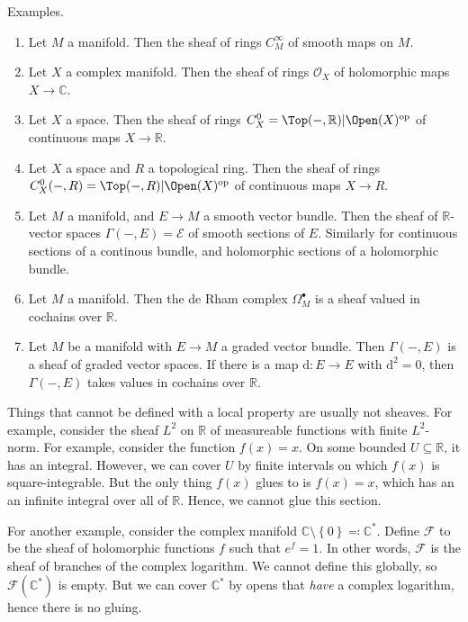 Examples.
\begin{enumerate}
	\item Let $M$ a manifold. Then the sheaf of rings $C^\infty_{M}$ of smooth maps on $M$.
	\item Let $X$ a complex manifold. Then the sheaf of rings $\mathcal{O}_{X} $ of holomorphic maps $X\to \mathbb{C} $.
	\item Let $X$ a space. Then the sheaf of rings $C^0_X=\Top (-,\mathbb{R} )|\Open(X)^{\mathrm{op}} $ of continuous maps $X\to \mathbb{R} $.
	\item Let $X$ a space and $R$ a topological ring. Then the sheaf of rings $C^0_X(-,R)=\Top (-,R)|\Open(X) ^{\mathrm{op}} $ of continuous maps $X\to R$.
	\item Let $M$ a manifold, and $E\to M$ a smooth vector bundle. Then the sheaf of $\mathbb{R} $-vector spaces $\Gamma (-,E)=\mathcal{E} $ of smooth sections of $E$. Similarly for continuous sections of a continous bundle, and holomorphic sections of a holomorphic bundle.
	\item Let $M$ a manifold. Then the de Rham complex $\Omega ^{\bullet} _M$ is a sheaf valued in cochains over $\mathbb{R} $.
	\item Let $M$ be a manifold with $E\to M$ a graded vector bundle. Then $\Gamma (-,E)$ is a sheaf of graded vector spaces. If there is a map $\mathrm{d}: E \to E$ with $\mathrm{d} ^2=0$, then $\Gamma (-,E)$ takes values in cochains over $\mathbb{R} $.
\end{enumerate}

Things that cannot be defined with a local property are usually not sheaves. For example, consider the sheaf $L^2$ on $\mathbb{R} $ of measureable functions with finite $L^2$-norm. For example, consider the function $f(x) = x$. On some bounded $U\subseteq \mathbb{R} $, it has an integral. However, we can cover $U$ by finite intervals on which $f(x)$ is square-integrable. But the only thing $f(x)$ glues to is $f(x)=x$, which has an an infinite integral over all of $\mathbb{R} $. Hence, we cannot glue this section.

For another example, consider the complex manifold $\mathbb{C} \setminus \left\{ 0 \right\} \eqqcolon \mathbb{C} ^*$. Define $\mathcal{F} $ to be the sheaf of holomorphic functions $f$ such that $e^f = 1$. In other words, $\mathcal{F} $ is the sheaf of branches of the complex logarithm. We cannot define this globally, so $\mathcal{F} (\mathbb{C} ^*)$ is empty. But we can cover $\mathbb{C} ^*$ by opens that \emph{have} a complex logarithm, hence there is no gluing.

